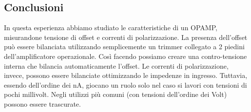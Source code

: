 








\subsection*{Conclusioni}
In questa esperienza abbiamo studiato le caratteristiche di un OPAMP, misurandone tensione di offset e correnti di polarizzazione. La presenza dell'offset può essere bilanciata utilizzando semplicemente un trimmer collegato a 2 piedini dell'amplificatore operazionale. Così facendo possiamo creare una contro-tensione interna che bilancia automaticamente l'offset. Le correnti di polarizzazione, invece, possono essere bilanciate ottimizzando le impedenze in ingresso. Tuttavia, essendo dell'ordine dei \si{\nano\ampere}, giocano un ruolo solo nel caso si lavori con tensioni di pochi millivolt. Negli utilizzi più comuni (con tensioni dell'ordine dei Volt) possono essere trascurate.





